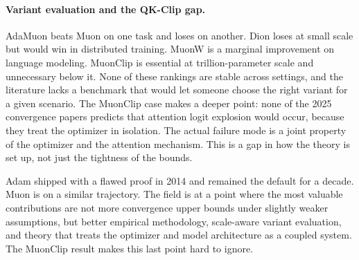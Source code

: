 \documentclass[11pt]{article}
\begin{document}
\paragraph{Variant evaluation and the QK-Clip gap.}
AdaMuon beats Muon on one task and loses on another. Dion loses at small scale but would win in distributed training. MuonW is a marginal improvement on language modeling. MuonClip is essential at trillion-parameter scale and unnecessary below it. None of these rankings are stable across settings, and the literature lacks a benchmark that would let someone choose the right variant for a given scenario. The MuonClip case makes a deeper point: none of the 2025 convergence papers predicts that attention logit explosion would occur, because they treat the optimizer in isolation. The actual failure mode is a joint property of the optimizer and the attention mechanism. This is a gap in how the theory is set up, not just the tightness of the bounds.

Adam shipped with a flawed proof in 2014 and remained the default for a decade. Muon is on a similar trajectory. The field is at a point where the most valuable contributions are not more convergence upper bounds under slightly weaker assumptions, but better empirical methodology, scale-aware variant evaluation, and theory that treats the optimizer and model architecture as a coupled system. The MuonClip result makes this last point hard to ignore.

\clearpage

\end{document}
